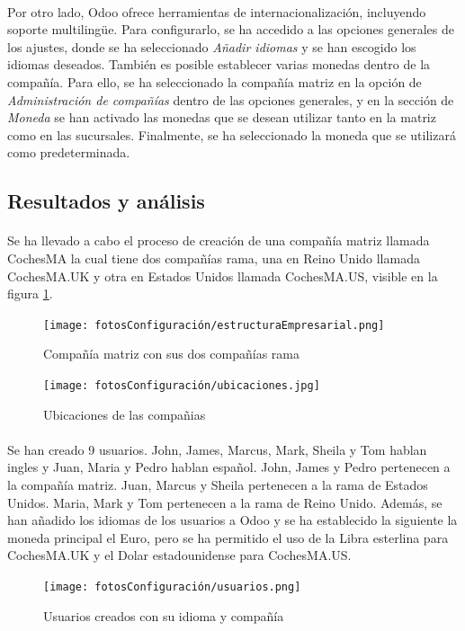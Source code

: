 \paragraph{}
Por otro lado, Odoo ofrece herramientas de internacionalización, incluyendo soporte multilingüe. Para configurarlo, se ha accedido a las opciones generales de los ajustes, donde se ha seleccionado \textit{Añadir idiomas} y se han escogido los idiomas deseados. También es posible establecer varias monedas dentro de la compañía. Para ello, se ha seleccionado la compañía matriz en la opción de \textit{Administración de compañías} dentro de las opciones generales, y en la sección de \textit{Moneda} se han activado las monedas que se desean utilizar tanto en la matriz como en las sucursales. Finalmente, se ha seleccionado la moneda que se utilizará como predeterminada.
\subsection{Resultados y análisis}
\paragraph{}
Se ha llevado a cabo el proceso de creación de una compañía matriz llamada CochesMA la cual tiene dos compañías rama, una en Reino Unido llamada CochesMA.UK y otra en Estados Unidos llamada CochesMA.US, visible en la figura \ref{fig:estructuraEmpresarial}.
\begin{figure}[h]
    \centering
    \texttt{[image: fotosConfiguración/estructuraEmpresarial.png]}
    \caption{Compañía matriz con sus dos compañías rama}
    \label{fig:estructuraEmpresarial}
\end{figure}
\begin{figure}[h]
    \centering
    \texttt{[image: fotosConfiguración/ubicaciones.jpg]}
    \caption{Ubicaciones de las compañias}
    \label{fig:enter-label}
\end{figure}
\paragraph{}
Se han creado 9 usuarios. John, James, Marcus, Mark, Sheila y Tom hablan ingles y Juan, Maria y Pedro hablan español. John, James y Pedro pertenecen a la compañía matriz. Juan, Marcus y Sheila pertenecen a la rama de Estados Unidos. Maria, Mark y Tom pertenecen a la rama de Reino Unido.
Además, se han añadido los idiomas de los usuarios a Odoo y se ha establecido la siguiente la moneda principal el Euro, pero se ha permitido el uso de la Libra esterlina para CochesMA.UK y el Dolar estadounidense para CochesMA.US. 
\begin{figure}[h]
    \centering
    \texttt{[image: fotosConfiguración/usuarios.png]}
    \caption{Usuarios creados con su idioma y compañía}
    \label{fig:enter-label}
\end{figure}

